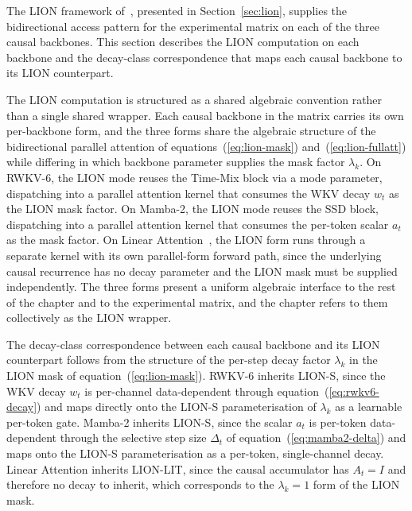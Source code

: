 The LION framework of~\citet{afzal2025linear}, presented in
Section~\ref{sec:lion}, supplies the bidirectional access pattern
for the experimental matrix on each of the three causal
backbones. This section describes the LION computation on each
backbone and the decay-class correspondence that maps each
causal backbone to its LION counterpart.

The LION computation is structured as a shared algebraic
convention rather than a single shared wrapper. Each causal
backbone in the matrix carries its own per-backbone form, and
the three forms share the algebraic structure of the
bidirectional parallel attention of equations~(\ref{eq:lion-mask})
and~(\ref{eq:lion-fullatt}) while differing in which backbone
parameter supplies the mask factor $\lambda_{k}$. On RWKV-6, the
LION mode reuses the Time-Mix block via a mode parameter,
dispatching into a parallel attention kernel that consumes the
WKV decay $w_{t}$ as the LION mask factor. On Mamba-2, the LION
mode reuses the SSD block, dispatching into a parallel attention
kernel that consumes the per-token scalar $a_{t}$ as the mask
factor. On Linear
Attention~\cite{katharopoulos2020transformers}, the LION form
runs through a separate kernel with its own parallel-form
forward path, since the underlying causal recurrence has no
decay parameter and the LION mask must be supplied independently.
The three forms present a uniform algebraic interface to the
rest of the chapter and to the experimental matrix, and the
chapter refers to them collectively as the LION wrapper.

The decay-class correspondence between each causal backbone and its
LION counterpart follows from the structure of the per-step decay
factor $\lambda_{k}$ in the LION mask of
equation~(\ref{eq:lion-mask}). RWKV-6 inherits LION-S, since the
WKV decay $w_{t}$ is per-channel data-dependent through
equation~(\ref{eq:rwkv6-decay}) and maps directly onto the LION-S
parameterisation of $\lambda_{k}$ as a learnable per-token gate.
Mamba-2 inherits LION-S, since the scalar $a_{t}$ is per-token
data-dependent through the selective step size $\Delta_{t}$ of
equation~(\ref{eq:mamba2-delta}) and maps onto the LION-S
parameterisation as a per-token, single-channel decay. Linear
Attention inherits LION-LIT, since the causal accumulator has
$A_{t} = I$ and therefore no decay to inherit, which corresponds
to the $\lambda_{k} = 1$ form of the LION mask.

